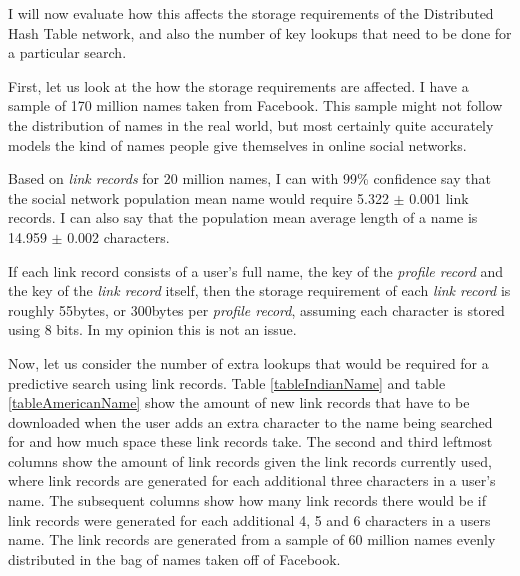 I will now evaluate how this affects the storage requirements of the Distributed Hash Table network, and also the number of key lookups that need to be done for a particular search.

First, let us look at the how the storage requirements are affected.
I have a sample of 170 million names taken from Facebook. This sample might not follow the distribution of names in the real world, but most certainly quite accurately models the kind of names people give themselves in online social networks.

Based on \emph{link records} for 20 million names, I can with 99\% confidence say that the social network population mean name would require 5.322 $\pm$ 0.001 link records. I can also say that the population mean average length of a name is 14.959 $\pm$ 0.002 characters.

If each link record consists of a user's full name, the key of the \emph{profile record} and the key of the \emph{link record} itself, then the storage requirement of each \emph{link record} is roughly 55bytes, or 300bytes per \emph{profile record}, assuming each character is stored using 8 bits.
In my opinion this is not an issue.

Now, let us consider the number of extra lookups that would be required for a predictive search using link records. Table \ref{tableIndianName} and table \ref{tableAmericanName} show the amount of new link records that have to be downloaded when the user adds an extra character to the name being searched for and how much space these link records take. The second and third leftmost columns show the amount of link records given the link records currently used, where link records are generated for each additional three characters in a user's name. The subsequent columns show how many link records there would be if link records were generated for each additional 4, 5 and 6 characters in a users name.
The link records are generated from a sample of 60 million names evenly distributed in the bag of names taken off of Facebook.

